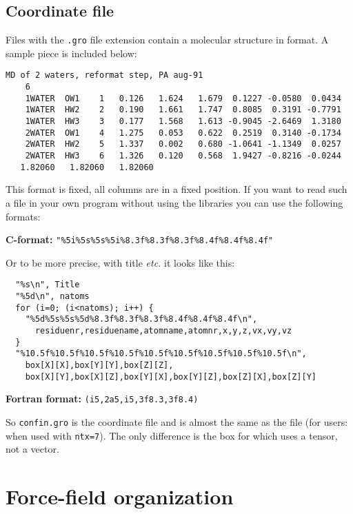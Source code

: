\subsection{Coordinate file}
\label{subsec:grofile}
Files with the {\tt .gro} file extension contain a molecular structure in 
 format. A sample piece is included below:

{\small
\begin{verbatim}
MD of 2 waters, reformat step, PA aug-91
    6
    1WATER  OW1    1   0.126   1.624   1.679  0.1227 -0.0580  0.0434
    1WATER  HW2    2   0.190   1.661   1.747  0.8085  0.3191 -0.7791
    1WATER  HW3    3   0.177   1.568   1.613 -0.9045 -2.6469  1.3180
    2WATER  OW1    4   1.275   0.053   0.622  0.2519  0.3140 -0.1734
    2WATER  HW2    5   1.337   0.002   0.680 -1.0641 -1.1349  0.0257
    2WATER  HW3    6   1.326   0.120   0.568  1.9427 -0.8216 -0.0244
   1.82060   1.82060   1.82060
\end{verbatim}}

This format is fixed, {\ie} all columns are in a fixed position. If you
want to read such a file in your own program without using the
{\gromacs} libraries you can use the following formats:

{\bf C-format:} {\tt "\%5i\%5s\%5s\%5i\%8.3f\%8.3f\%8.3f\%8.4f\%8.4f\%8.4f"}

Or to be more precise, with title {\em etc.} it looks like this:

\begin{verbatim}
  "%s\n", Title
  "%5d\n", natoms
  for (i=0; (i<natoms); i++) {
    "%5d%5s%5s%5d%8.3f%8.3f%8.3f%8.4f%8.4f%8.4f\n",
      residuenr,residuename,atomname,atomnr,x,y,z,vx,vy,vz
  }
  "%10.5f%10.5f%10.5f%10.5f%10.5f%10.5f%10.5f%10.5f%10.5f\n",
    box[X][X],box[Y][Y],box[Z][Z],
    box[X][Y],box[X][Z],box[Y][X],box[Y][Z],box[Z][X],box[Z][Y]
\end{verbatim}

{\bf Fortran format:} {\tt (i5,2a5,i5,3f8.3,3f8.4)}

So {\tt confin.gro} is the {\gromacs} coordinate file and is almost
the same as the  file (for {\gromos} users: when used with
{\tt ntx=7}).  The only difference is the box for which {\gromacs} uses a
tensor, not a vector.



\section{Force-field organization }
\label{sec:fforganization}

